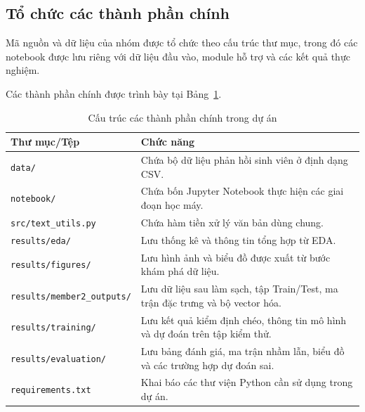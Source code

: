 \subsection{Tổ chức các thành phần chính}

Mã nguồn và dữ liệu của nhóm được tổ chức theo cấu trúc thư mục, trong đó các notebook được lưu riêng với dữ liệu đầu vào, module hỗ trợ và các kết quả thực nghiệm.

Các thành phần chính được trình bày tại Bảng~\ref{tab:cau-truc-du-an}.

\begin{table}[H]
\centering
\caption{Cấu trúc các thành phần chính trong dự án}
\label{tab:cau-truc-du-an}
\renewcommand{\arraystretch}{1.15}

\begin{tabularx}{\textwidth}{|p{}|X|}
\hline
\textbf{Thư mục/Tệp} &
\textbf{Chức năng} \\
\hline

\texttt{data/} &
Chứa bộ dữ liệu phản hồi sinh viên ở định dạng CSV. \\
\hline

\texttt{notebook/} &
Chứa bốn Jupyter Notebook thực hiện các giai đoạn học máy. \\
\hline

\texttt{src/text\_utils.py} &
Chứa hàm tiền xử lý văn bản dùng chung. \\
\hline

\texttt{results/eda/} &
Lưu thống kê và thông tin tổng hợp từ EDA. \\
\hline

\texttt{results/figures/} &
Lưu hình ảnh và biểu đồ được xuất từ bước khám phá dữ liệu. \\
\hline

\texttt{results/member2\_outputs/} &
Lưu dữ liệu sau làm sạch, tập Train/Test, ma trận đặc trưng và bộ vector hóa. \\
\hline

\texttt{results/training/} &
Lưu kết quả kiểm định chéo, thông tin mô hình và dự đoán trên tập kiểm thử. \\
\hline

\texttt{results/evaluation/} &
Lưu bảng đánh giá, ma trận nhầm lẫn, biểu đồ và các trường hợp dự đoán sai. \\
\hline

\texttt{requirements.txt} &
Khai báo các thư viện Python cần sử dụng trong dự án. \\
\hline

\end{tabularx}
\end{table}

